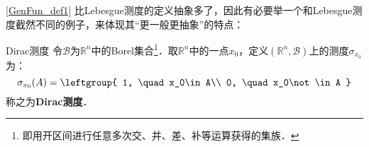 \autoref{GenFun_def1} 比Lebesgue测度的定义抽象多了，因此有必要举一个和Lebesgue测度截然不同的例子，来体现其“更一般更抽象”的特点：

\begin{example}{Dirac测度}
令$\mathcal{B}$为$\mathbb{R}^n$中的Borel集合\footnote{即用开区间进行任意多次交、并、差、补等运算获得的集族．}．取$\mathbb{R}^n$中的一点$x_0$，定义$(\mathbb{R}^n, \mathcal{B})$上的测度$\sigma_{x_0}$为：
\begin{equation}
\sigma_{x_0}(A)=\leftgroup{
    1, \quad x_0\in A\\
    0, \quad x_0\not\in A
}
\end{equation}
称之为\textbf{Dirac测度}．
\end{example}























